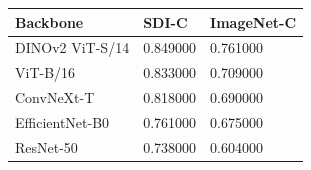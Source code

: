 \begin{tabular}{lll}
\toprule
Backbone & SDI-C & ImageNet-C \\
\midrule
DINOv2 ViT-S/14 & 0.849000 & 0.761000 \\
ViT-B/16 & 0.833000 & 0.709000 \\
ConvNeXt-T & 0.818000 & 0.690000 \\
EfficientNet-B0 & 0.761000 & 0.675000 \\
ResNet-50 & 0.738000 & 0.604000 \\
\bottomrule
\end{tabular}
